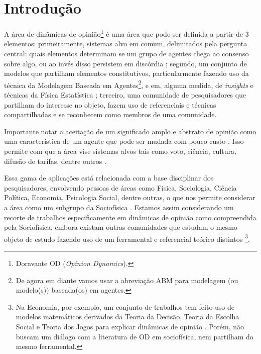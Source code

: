 
\section{Introdução}

A área de dinâmicas de opinião\footnote{Doravante OD (\textit{Opinion
    Dynamics}).} é uma área que pode ser definida a partir de 3 elementos:
primeiramente, sistemas alvo em comum, delimitados pela pergunta central: quais
elementos determinam se um grupo de agentes chega ao consenso sobre algo, ou ao
invés disso persistem em discórdia \cite{castellano2012social} ; segundo, um
conjunto de modelos que partilham elementos constitutivos, particularmente
fazendo uso da técnica da Modelagem Baseada em Agentes\footnote{De agora em
  diante vamos usar a abreviação ABM para modelagem (ou modelo(s)) baseada(os)
  em agentes.}, e em, alguma medida, de \textit{insights} e técnicas da Física
Estatística \cite{galam1990social}; terceiro, uma comunidade de pesquisadores
que partilham do interesse no objeto, fazem uso de referenciais e técnicas
compartilhadas e se reconhecem como membros de uma comunidade.

Importante notar a aceitação de um significado amplo e abstrato de opinião como
uma característica de um agente que pode ser mudada com pouco custo
\cite[p.312]{castellano2012social}. Isso permite com que a área vise sistemas
alvos tais como voto, ciência, cultura, difusão de tarifas, dentre
outros
\cite{kowalska2013going,martins2015thou,axelrod1997dissemination,galam1990social}.

Essa gama de aplicações está relacionada com a base disciplinar dos pesquisadores,
envolvendo pessoas de áreas como Física, Sociologia, Ciência Política, Economia,
Psicologia Social, dentre outras, o que nos permite considerar a área como um
subgrupo da Sociofísica \cite{galam1982sociophysics,galam2012sociophysics}.
Estamos assim considerando um recorte de trabalhos especificamente em dinâmicas de
opinião como compreendida pela Sociofísica, embora existam outras comunidades
que estudam o mesmo objeto de estudo fazendo uso de um ferramental e referencial
teórico distintos \footnote{Na Economia, por exemplo, um
  conjunto de trabalhos tem feito uso de modelos matemáticos derivados da Teoria
  da Decisão, Teoria da Escolha Social e Teoria dos Jogos para explicar
  dinâmicas de opinião \cite{acemoglu2011opinion}. Porém, não buscam um diálogo
  com a literatura de OD em sociofísica, nem partilham do mesmo ferramental.}.

